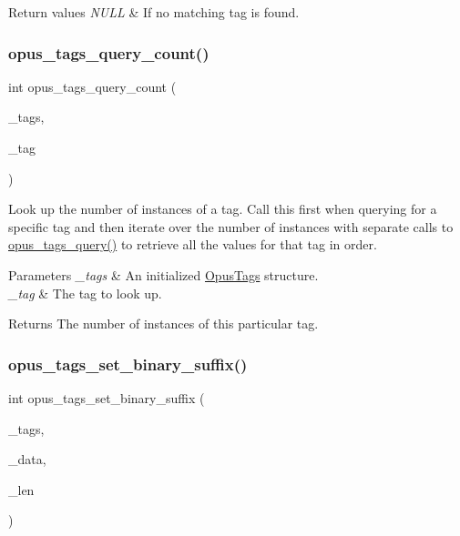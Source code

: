\begin{DoxyRetVals}{Return values}
{\em N\+U\+LL} & If no matching tag is found. \\
\hline
\end{DoxyRetVals}
\mbox{\label{group__header__info_ga6e0bbe5a717115180bf4aa596bd0b2d1}} 
\subsubsection{\texorpdfstring{opus\_tags\_query\_count()}{opus\_tags\_query\_count()}}
{\footnotesize\ttfamily int opus\+\_\+tags\+\_\+query\+\_\+count (\begin{DoxyParamCaption}\item[{const \mbox{\hyperlink{struct_opus_tags}{Opus\+Tags}} $\ast$}]{\+\_\+tags,  }\item[{const char $\ast$}]{\+\_\+tag }\end{DoxyParamCaption})}

Look up the number of instances of a tag. Call this first when querying for a specific tag and then iterate over the number of instances with separate calls to \mbox{\hyperlink{group__header__info_gad43a7ed5844debd7d4025335f096bc27}{opus\+\_\+tags\+\_\+query()}} to retrieve all the values for that tag in order. 
\begin{DoxyParams}{Parameters}
{\em \+\_\+tags} & An initialized \mbox{\hyperlink{struct_opus_tags}{Opus\+Tags}} structure. \\
\hline
{\em \+\_\+tag} & The tag to look up. \\
\hline
\end{DoxyParams}
\begin{DoxyReturn}{Returns}
The number of instances of this particular tag. 
\end{DoxyReturn}
\mbox{\label{group__header__info_ga670be1155863aabc9f8d2cf064021131}} 
\subsubsection{\texorpdfstring{opus\_tags\_set\_binary\_suffix()}{opus\_tags\_set\_binary\_suffix()}}
{\footnotesize\ttfamily int opus\+\_\+tags\+\_\+set\+\_\+binary\+\_\+suffix (\begin{DoxyParamCaption}\item[{\mbox{\hyperlink{struct_opus_tags}{Opus\+Tags}} $\ast$}]{\+\_\+tags,  }\item[{const unsigned char $\ast$}]{\+\_\+data,  }\item[{int}]{\+\_\+len }\end{DoxyParamCaption})}


